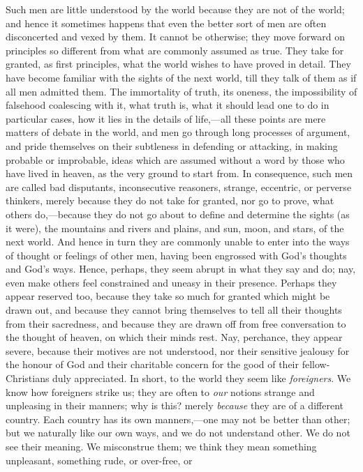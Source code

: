 Such men are little understood by the world because they are not of
the world; and hence it sometimes happens that even the better sort of
men are often disconcerted and vexed by them. It cannot be otherwise;
they move forward on principles so different from what are commonly
assumed as true. They take for granted, as first principles, what the
world wishes to have proved in detail. They have become familiar with
the sights of the next world, till they talk of them as if all men
admitted them. The immortality of truth, its oneness, the
impossibility of falsehood coalescing with it, what truth is, what it
should lead one to do in particular cases, how it lies in the details
of life,—all these points are mere matters of debate in the world,
and men go through long processes of argument, and pride themselves on
their subtleness in defending or attacking, in making probable or
improbable, ideas which are assumed without a word by those who have
lived in heaven, as the very ground to start from. In consequence,
such men are called bad disputants, inconsecutive reasoners, strange,
eccentric, or perverse thinkers, merely because they do not take for
granted, nor go to prove, what others do,—because they do not go
about to define and determine the sights (as it were), the mountains
and rivers and plains, and sun, moon, and stars, of the next world.
And hence in turn they are commonly unable to enter into the ways of
thought or feelings of other men, having been engrossed with God's
thoughts and God's ways. Hence, perhaps, they seem abrupt in what they
say and do; nay, even make others feel constrained and uneasy in their
presence. Perhaps they appear reserved too, because they take so much
for granted which might be drawn out, and because they cannot bring
themselves to tell all their thoughts from their sacredness, and
because they are drawn off from free conversation to the thought of
heaven, on which their minds rest. Nay, perchance, they appear severe,
because their motives are not understood, nor their sensitive jealousy
for the honour of God and their charitable concern for the good of
their fellow-Christians duly appreciated. In short, to the world they
seem like \emph{foreigners}. We know how foreigners strike us; they
are often to \emph{our} notions strange and unpleasing in their
manners; why is this? merely \emph{because} they are of a different
country. Each country has its own manners,—one may not be better
than other; but we naturally like our own ways, and we do not
understand other. We do not see their meaning. We misconstrue them; we
think they mean something unpleasant, something rude, or over-free, or
